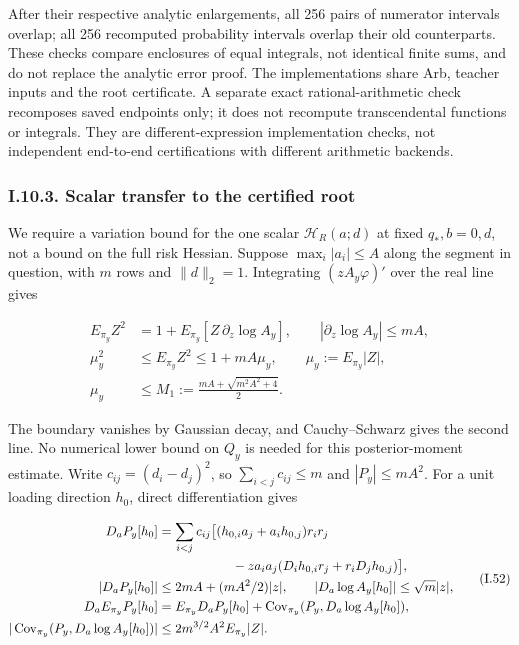 \documentclass{article}
\begin{document}
After their respective analytic enlargements, all 256 pairs of numerator
intervals overlap; all 256 recomputed probability intervals overlap
their old counterparts. These checks compare enclosures of equal
integrals, not identical finite sums, and do not replace the analytic
error proof. The implementations share Arb, teacher inputs and the root
certificate. A separate exact rational-arithmetic check recomposes saved
endpoints only; it does not recompute transcendental functions or
integrals. They are different-expression implementation checks, not
independent end-to-end certifications with different arithmetic
backends.

\subsubsection*{I.10.3. Scalar transfer to the certified
root}\label{i.10.3.-scalar-transfer-to-the-certified-root}

We require a variation bound for the one scalar \(\mathcal H_R(a;d)\) at
fixed \(q_*,b=0,d\), not a bound on the full risk Hessian. Suppose
\(\max_i|a_i|\le A\) along the segment in question, with \(m\) rows and
\(\|d\|_2=1\). Integrating \((zA_y\varphi)'\) over the real line gives

\[
\begin{aligned}
E_{\pi_y}Z^2&=1+E_{\pi_y}[Z\,\partial_z\log A_y],\qquad
|\partial_z\log A_y|\le mA,\\
\mu_y^2&\le E_{\pi_y}Z^2\le1+mA\mu_y,\qquad \mu_y:=E_{\pi_y}|Z|,\\
\mu_y&\le M_1:=\frac{mA+\sqrt{m^2A^2+4}}2.
\end{aligned}
\tag{I.51}
\]

The boundary vanishes by Gaussian decay, and Cauchy--Schwarz gives the
second line. No numerical lower bound on \(Q_y\) is needed for this
posterior-moment estimate. Write \(c_{ij}=(d_i-d_j)^2\), so
\(\sum_{i<j}c_{ij}\le m\) and \(|P_y|\le mA^2\). For a unit loading
direction \(h_0\), direct differentiation gives

\[
\begin{aligned}
D_aP_y[h_0]&=\sum_{i<j}c_{ij}\big[(h_{0,i}a_j+a_ih_{0,j})r_ir_j\\
&\hspace{20mm}-za_ia_j(D_ih_{0,i}r_j+r_iD_jh_{0,j})\big],\\
|D_aP_y[h_0]|&\le2mA+(mA^2/2)|z|,\qquad
|D_a\log A_y[h_0]|\le\sqrt m|z|,\\
D_a E_{\pi_y}P_y[h_0]&=E_{\pi_y}D_aP_y[h_0]
+\operatorname{Cov}_{\pi_y}(P_y,D_a\log A_y[h_0]),\\
|\operatorname{Cov}_{\pi_y}(P_y,D_a\log A_y[h_0])|
&\le2m^{3/2}A^2 E_{\pi_y}|Z|.
\end{aligned}
\tag{I.52}
\]
\end{document}
